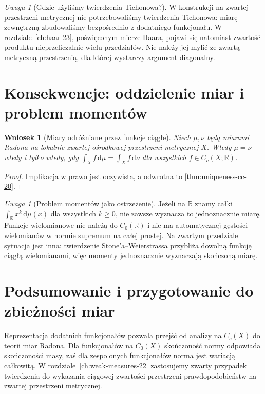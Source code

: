 \documentclass[11pt,a4paper,oneside]{book}
\numberwithin{equation}{chapter}
\theoremstyle{plain}
\newtheorem{wniosek}[twierdzenie]{Wniosek}
\theoremstyle{definition}
\theoremstyle{remark}
\newtheorem{uwaga}[twierdzenie]{Uwaga}
\begin{document}
\begin{uwaga}[Gdzie użyliśmy twierdzenia Tichonowa?]
W konstrukcji na zwartej przestrzeni metrycznej nie
potrzebowaliśmy twierdzenia Tichonowa: miarę zewnętrzną
zbudowaliśmy bezpośrednio z dodatniego funkcjonału.
W rozdziale~\ref{ch:haar-23}, poświęconym mierze Haara,
pojawi się natomiast zwartość produktu nieprzeliczalnie
wielu przedziałów.
Nie należy jej mylić ze zwartą metryczną przestrzenią,
dla której wystarczy argument diagonalny.
\end{uwaga}

\section{Konsekwencje: oddzielenie miar i problem momentów}
\begin{wniosek}[Miary odróżniane przez funkcje ciągłe]
\label{cor:measures-separate-21}
Niech $\mu,\nu$ będą miarami Radona na lokalnie zwartej
ośrodkowej przestrzeni metrycznej $X$. Wtedy
$\mu=\nu$ wtedy i tylko wtedy, gdy
$\int_Xf\,\mathrm d\mu=\int_Xf\,\mathrm d\nu$
dla wszystkich $f\in C_c(X;\mathbb R)$.
\end{wniosek}
\begin{proof}
Implikacja w prawo jest oczywista, a odwrotna to
\ref{thm:uniqueness-cc-20}.
\end{proof}

\begin{uwaga}[Problem momentów jako ostrzeżenie]
Jeżeli na $\mathbb R$ znamy całki
$\int_{\mathbb R}x^k\,\mathrm d\mu(x)$ dla wszystkich
$k\ge0$, nie zawsze wyznacza to jednoznacznie miarę.
Funkcje wielomianowe nie należą do $C_0(\mathbb R)$
i nie ma automatycznej gęstości wielomianów w normie
supremum na całej prostej. Na zwartym przedziale
sytuacja jest inna: twierdzenie Stone'a--Weierstrassa
przybliża dowolną funkcję ciągłą wielomianami,
więc momenty jednoznacznie wyznaczają skończoną miarę.
\end{uwaga}

\section{Podsumowanie i przygotowanie do zbieżności miar}
Reprezentacja dodatnich funkcjonałów pozwala przejść
od analizy na $C_c(X)$ do teorii miar Radona. Dla
funkcjonałów na $C_0(X)$ skończoność normy odpowiada
skończoności masy, zaś dla zespolonych funkcjonałów
norma jest wariacją całkowitą. W rozdziale~\ref{ch:weak-measures-22}
zastosujemy zwarty przypadek twierdzenia do wykazania
ciągowej zwartości przestrzeni prawdopodobieństw na
zwartej przestrzeni metrycznej.
\end{document}
